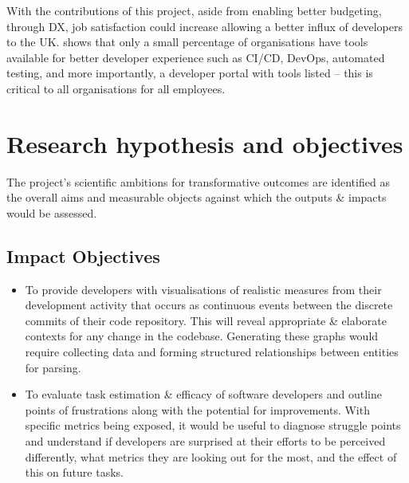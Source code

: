 \documentclass{prrcs}
\begin{document}
With the contributions of this project, aside from enabling better budgeting, through DX, job satisfaction could increase allowing a better influx of developers to the UK. \textcite{StackOverflowDeveloper} shows that only a small percentage of organisations have tools available for better developer experience such as CI/CD, DevOps, automated testing, and more importantly, a developer portal with tools listed -- this is critical to all organisations for all employees.

\section{Research hypothesis and objectives}




The project's scientific ambitions for transformative outcomes are identified as the overall aims and measurable objects against which the outputs \& impacts would be assessed.

\subsection*{Impact Objectives}

\begin{itemize}
    \item To provide developers with visualisations of realistic measures from their development activity that occurs as continuous events between the discrete commits of their code repository. This will reveal appropriate \& elaborate contexts for any change in the codebase. Generating these graphs would require collecting data and forming structured relationships between entities for parsing.
    \item To evaluate task estimation \& efficacy of software developers and outline points of frustrations along with the potential for improvements. With specific metrics being exposed, it would be useful to diagnose struggle points and understand if developers are surprised at their efforts to be perceived differently, what metrics they are looking out for the most, and the effect of this on future tasks.
\end{itemize}
\end{document}
